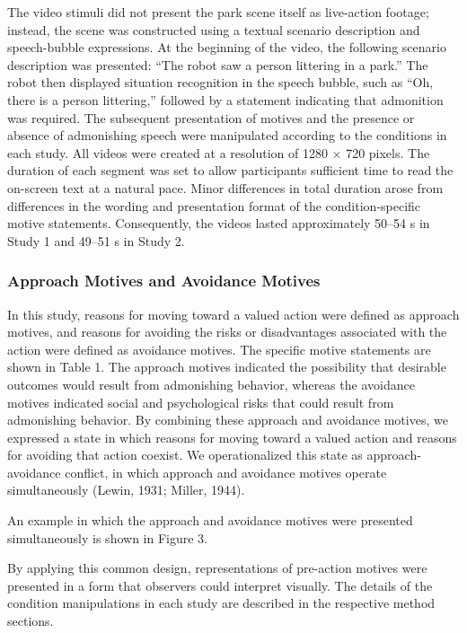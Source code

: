 The video stimuli did not present the park scene itself as live-action
footage; instead, the scene was constructed using a textual scenario
description and speech-bubble expressions. At the beginning of the
video, the following scenario description was presented: ``The robot saw
a person littering in a park.'' The robot then displayed situation
recognition in the speech bubble, such as ``Oh, there is a person
littering,'' followed by a statement indicating that admonition was
required. The subsequent presentation of motives and the presence or
absence of admonishing speech were manipulated according to the
conditions in each study. All videos were created at a resolution of
1280 × 720 pixels. The duration of each segment was set to allow
participants sufficient time to read the on-screen text at a natural
pace. Minor differences in total duration arose from differences in the
wording and presentation format of the condition-specific motive
statements. Consequently, the videos lasted approximately 50--54 s in
Study 1 and 49--51 s in Study 2.

\subsubsection{Approach Motives and Avoidance
Motives}\label{approach-motives-and-avoidance-motives}

In this study, reasons for moving toward a valued action were defined as
approach motives, and reasons for avoiding the risks or disadvantages
associated with the action were defined as avoidance motives. The
specific motive statements are shown in Table 1. The approach motives
indicated the possibility that desirable outcomes would result from
admonishing behavior, whereas the avoidance motives indicated social and
psychological risks that could result from admonishing behavior. By
combining these approach and avoidance motives, we expressed a state in
which reasons for moving toward a valued action and reasons for avoiding
that action coexist. We operationalized this state as approach-avoidance
conflict, in which approach and avoidance motives operate simultaneously
(Lewin, 1931; Miller, 1944).

An example in which the approach and avoidance motives were presented
simultaneously is shown in Figure 3.

By applying this common design, representations of pre-action motives
were presented in a form that observers could interpret visually. The
details of the condition manipulations in each study are described in
the respective method sections.

